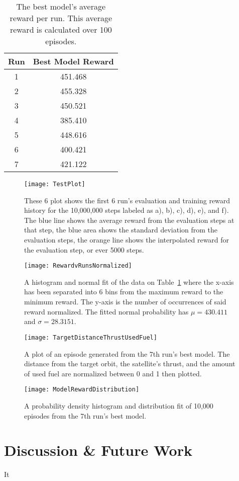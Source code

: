 \begin{table}
	\centering
	\begin{tabular}{|c|c|} \hline
		Run & Best Model Reward \\\hline\hline
		1 & 451.468 \\\hline
		2 & 455.328 \\\hline
		3 & 450.521 \\\hline
		4 & 385.410 \\\hline
		5 & 448.616 \\\hline
		6 & 400.421 \\\hline
		7 & 421.122 \\\hline
	\end{tabular}
	\caption{The best model's average reward per run. This average reward is calculated over 100 episodes.}
	\label{table:best_evaluation_rewards}
\end{table}

\begin{figure}
	\centering
	\texttt{[image: TestPlot]}
	\caption{These 6 plot shows the first 6 run's evaluation and training reward history for the 10,000,000 steps labeled as a), b), c), d), e), and f). The blue line shows the average reward from the evaluation steps at that step, the blue area shows the standard deviation from the evaluation steps, the orange line shows the interpolated reward for the evaluation step, or ever 5000 steps. }
	\label{fig:validation_runs}
\end{figure}

\begin{figure}
	\centering
	\texttt{[image: RewardvRunsNormalized]}
	\caption{A histogram and normal fit of the data on Table~\ref{table:best_evaluation_rewards} where the x-axis has been separated into 6 bins from the maximum reward to the minimum reward. The y-axis is the number of occurrences of said reward normalized. The fitted normal probability has $\mu=430.411$ and $\sigma=28.3151$.}
	\label{fig:norm_hist_reward}
\end{figure}

\begin{figure}
	\centering
	\texttt{[image: TargetDistanceThrustUsedFuel]}
	\caption{A plot of an episode generated from the 7th run's best model. The distance from the target orbit, the satellite's thrust, and the amount of used fuel are normalized between 0 and 1 then plotted.}
	\label{fig:tdtuf}
\end{figure}

\begin{figure}
	\centering
	\texttt{[image: ModelRewardDistribution]}
	\caption{A probability density histogram and distribution fit of 10,000 episodes from the 7th run's best model.}
	\label{fig:model_reward_distribution}
\end{figure}

\section{Discussion \& Future Work}

It 